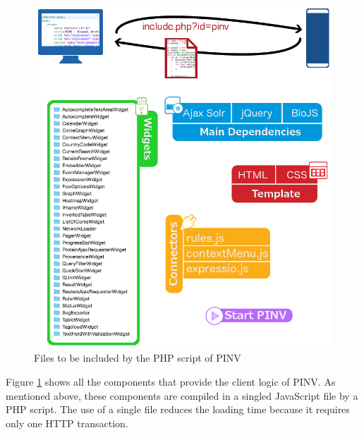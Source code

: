 \begin{figure}
\centering
\includegraphics[width=\textwidth]{figures/include_php.png}
\caption[Files to be included by the PHP script of PINV]{Files to be included by the PHP script of PINV
\label{fig:pinv_include}}
\end{figure}

Figure \ref{fig:pinv_include} shows all the components that provide the client logic of PINV. As mentioned above, these components are compiled in a singled JavaScript file by a PHP script. The use of a single file reduces the loading time because it requires only one HTTP transaction. 

